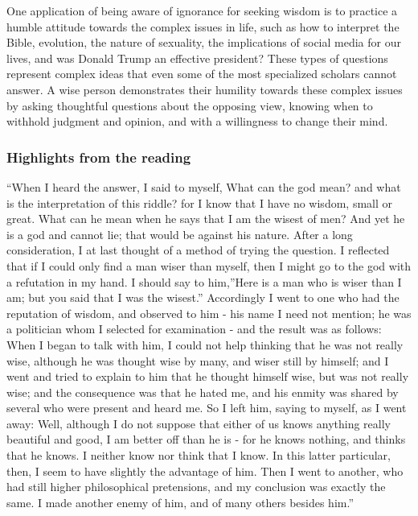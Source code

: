 \documentclass[
]{book}
\begin{document}
One application of being aware of ignorance for seeking wisdom is to practice a humble attitude towards the complex issues in life, such as how to interpret the Bible, evolution, the nature of sexuality, the implications of social media for our lives, and was Donald Trump an effective president? These types of questions represent complex ideas that even some of the most specialized scholars cannot answer. A wise person demonstrates their humility towards these complex issues by asking thoughtful questions about the opposing view, knowing when to withhold judgment and opinion, and with a willingness to change their mind.

\hypertarget{highlights-from-the-reading-2}{%
\subsubsection*{Highlights from the reading}\label{highlights-from-the-reading-2}}

``When I heard the answer, I said to myself, What can the god mean? and what is the interpretation of this riddle? for I know that I have no wisdom, small or great. What can he mean when he says that I am the wisest of men? And yet he is a god and cannot lie; that would be against his nature. After a long consideration, I at last thought of a method of trying the question. I reflected that if I could only find a man wiser than myself, then I might go to the god with a refutation in my hand. I should say to him,''Here is a man who is wiser than I am; but you said that I was the wisest.'' Accordingly I went to one who had the reputation of wisdom, and observed to him - his name I need not mention; he was a politician whom I selected for examination - and the result was as follows: When I began to talk with him, I could not help thinking that he was not really wise, although he was thought wise by many, and wiser still by himself; and I went and tried to explain to him that he thought himself wise, but was not really wise; and the consequence was that he hated me, and his enmity was shared by several who were present and heard me. So I left him, saying to myself, as I went away: Well, although I do not suppose that either of us knows anything really beautiful and good, I am better off than he is - for he knows nothing, and thinks that he knows. I neither know nor think that I know. In this latter particular, then, I seem to have slightly the advantage of him. Then I went to another, who had still higher philosophical pretensions, and my conclusion was exactly the same. I made another enemy of him, and of many others besides him.''
\end{document}
